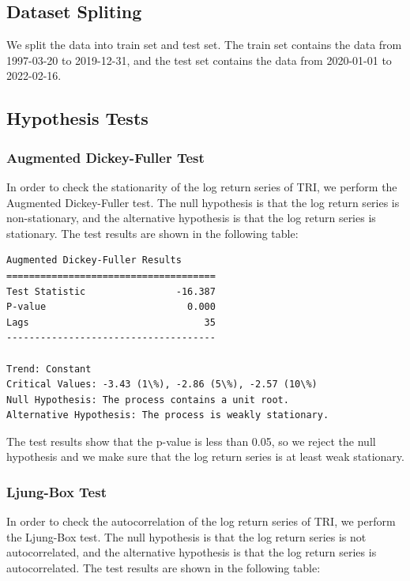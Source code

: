 \documentclass[runningheads]{llncs}
\begin{document}
\subsection{Dataset Spliting}

We split the data into train set and test set. The train set contains the data from 1997-03-20 to 2019-12-31, and the test set contains the data from 2020-01-01 to 2022-02-16.

\subsection{Hypothesis Tests}

\subsubsection*{Augmented Dickey-Fuller Test}

In order to check the stationarity of the log return series of TRI, we perform the Augmented Dickey-Fuller test. The null hypothesis is that the log return series is non-stationary, and the alternative hypothesis is that the log return series is stationary.
The test results are shown in the following table:

\begin{verbatim}
Augmented Dickey-Fuller Results   
=====================================
Test Statistic                -16.387
P-value                         0.000
Lags                               35
-------------------------------------

Trend: Constant
Critical Values: -3.43 (1\%), -2.86 (5\%), -2.57 (10\%)
Null Hypothesis: The process contains a unit root.
Alternative Hypothesis: The process is weakly stationary.    
\end{verbatim}

The test results show that the p-value is less than 0.05, so we reject the null hypothesis and we make sure that the log return series is at least weak stationary.

\subsubsection*{Ljung-Box Test}

In order to check the autocorrelation of the log return series of TRI, we perform the Ljung-Box test. The null hypothesis is that the log return series is not autocorrelated, and the alternative hypothesis is that the log return series is autocorrelated. The test results are shown in the following table:
\end{document}
